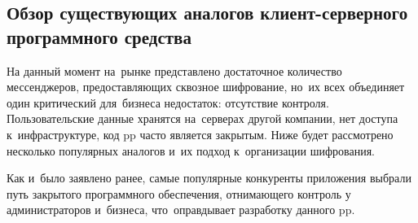 \subsection{Обзор существующих аналогов клиент-серверного программного средства}
\label{sec:analysis:research:analogs}

На данный момент на~рынке представлено достаточное количество мессенджеров, предоставляющих сквозное шифрование, но~их всех объединяет один критический для~бизнеса недостаток: отсутствие контроля. 
Пользовательские данные хранятся на~серверах другой компании, нет доступа к~инфраструктуре, код \gls{pp} часто является закрытым. Ниже будет рассмотрено несколько популярных аналогов и~их подход к~организации шифрования.




Как и~было заявлено ранее, самые популярные конкуренты приложения выбрали путь закрытого программного обеспечения, отнимающего контроль у администраторов и~бизнеса, что~оправдывает разработку данного \gls{pp}.